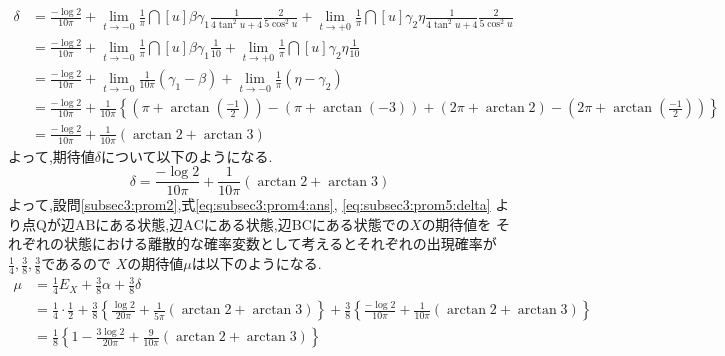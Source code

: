 \documentclass[dvipdfmx,titlepage, 11pt, a4paper]{jsarticle}%
\renewcommand{\thesection}{第\arabic{section}問}
\renewcommand{\thesubsection}{\thesection}
\begin{document}
\begin{enumerate}[(1)]
  \begin{align*}
    \delta 
    &= \frac{-\log 2}{10\pi} + \lim_{t \to -0}\frac{1}{\pi}\dint[u]{\beta}{\gamma_1}{\frac{1}{4\tan^{2}u + 4}\frac{2}{5\cos^{2}u}}
      + \lim_{t \to +0}\frac{1}{\pi}\dint[u]{\gamma_2}{\eta}{\frac{1}{4\tan^{2}u + 4}\frac{2}{5\cos^{2}u}}\\
    &= \frac{-\log 2}{10\pi} + \lim_{t \to -0}\frac{1}{\pi}\dint[u]{\beta}{\gamma_1}{\frac{1}{10}} 
      + \lim_{t \to +0}\frac{1}{\pi}\dint[u]{\gamma_2}{\eta}{\frac{1}{10}}\\
    &= \frac{-\log 2}{10\pi} + \lim_{t \to -0}\frac{1}{10\pi}(\gamma_1 - \beta) + \lim_{t \to -0}\frac{1}{\pi}(\eta - \gamma_2)\\
    &= \frac{-\log 2}{10\pi} + \frac{1}{10\pi}\left\{\left(\pi + \arctan\left(\frac{-1}{2}\right)\right) - (\pi + \arctan(-3))
      + (2\pi + \arctan 2) - \left(2\pi + \arctan\left(\frac{-1}{2}\right)\right)\right\}\\
    &= \frac{-\log 2}{10\pi} + \frac{1}{10\pi}(\arctan 2 + \arctan 3)
  \end{align*}
  よって,期待値$\delta$について以下のようになる.
  \begin{equation}
    \delta = \frac{-\log 2}{10\pi} + \frac{1}{10\pi}(\arctan 2 + \arctan 3)\label{eq:subsec3:prom5:delta}
  \end{equation}
  よって,設問\eqref{subsec3:prom2},式\eqref{eq:subsec3:prom4:ans}, \eqref{eq:subsec3:prom5:delta}
  より点$\mathrm{Q}$が辺$\mathrm{AB}$にある状態,辺$\mathrm{AC}$にある状態,辺$\mathrm{BC}$にある状態での$X$の期待値を
  それぞれの状態における離散的な確率変数として考えるとそれぞれの出現確率が$\frac{1}{4}, \frac{3}{8}, \frac{3}{8}$であるので
  $X$の期待値$\mu$は以下のようになる.
  \begin{align*}
    \mu &= \frac{1}{4}E_{X} + \frac{3}{8}\alpha + \frac{3}{8}\delta\\
        &= \frac{1}{4}\cdot\frac{1}{2} 
          + \frac{3}{8}\left\{\frac{\log 2}{20\pi} + \frac{1}{5\pi}(\arctan 2 + \arctan 3)\right\}
          + \frac{3}{8}\left\{\frac{-\log 2}{10\pi} + \frac{1}{10\pi}(\arctan 2 + \arctan 3)\right\}\\
        &= \frac{1}{8}\left\{1 - \frac{3\log 2}{20\pi} + \frac{9}{10\pi}(\arctan 2 + \arctan 3)\right\}
  \end{align*}
\end{enumerate}

\newpage

\renewcommand{\thesection}{自信のない解法or解けたとこまで}
\renewcommand{\thesubsection}{第\arabic{subsection}問}
\end{document}
